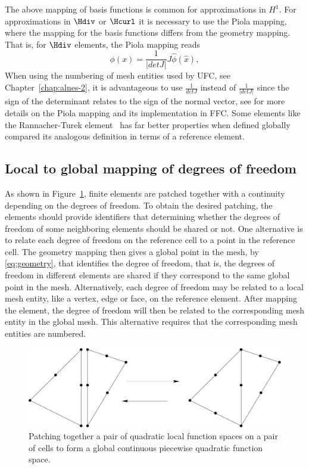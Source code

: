 The above mapping of basis functions is common for approximations in
$H^1$. For approximations in $\Hdiv$ or $\Hcurl$ it is necessary to use
the Piola mapping, where the mapping for the basis functions differs
from the geometry mapping. That is, for $\Hdiv$ elements, the Piola
mapping reads
\begin{equation}
\phi(x) = \frac{1}{|detJ|} J \hat{\phi}(\hat x),
\end{equation}
When using the numbering of mesh entities used by UFC, see
Chapter~\ref{chap:alnes-2}, it is advantageous to use $\frac{1}{detJ}$
instead of $\frac{1}{|detJ|}$ since the sign of the determinant relates
to the sign of the normal vector, see \citet{RognesKirbyLogg2009} for more
details on the Piola mapping and its implementation in FFC.  Some elements
like the Rannacher-Turek element~\citep{Turek1999,RannacherTurek1992}
has far better properties when defined globally compared its analogous
definition in terms of a reference element.


\subsection{Local to global mapping of degrees of freedom}

As shown in Figure~\ref{fig:kirby-1:patch}, finite elements are
patched together with a continuity depending on the degrees of freedom.
To obtain the desired patching, the elements should provide identifiers
that determining whether the degrees of freedom of some neighboring
elements should be shared or not.  One alternative is to relate each
degree of freedom on the reference cell to a point in the reference
cell. The geometry mapping then gives a global point in the mesh, by
\eqref{eq:geometry}, that identifies the degree of freedom, that is, the
degrees of freedom in different elements are shared if they correspond to
the same global point in the mesh.  Alternatively, each degree of freedom
may be related to a local mesh entity, like a vertex, edge or face, on the
reference element. After mapping the element, the degree of freedom will
then be related to the corresponding mesh entity in the global mesh. This
alternative requires that the corresponding mesh entities are numbered.

\begin{figure}
  \begin{center}
    \includegraphics[width=\largefig]{chapters/kirby-1/pdf/patch.pdf}
    \caption{Patching together a pair of quadratic local function
      spaces on a pair of cells to form a global continuous
      piecewise quadratic function space.}
    \label{fig:kirby-1:patch}
  \end{center}
\end{figure}
